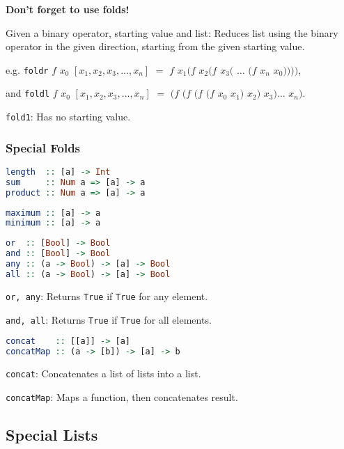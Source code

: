 \documentclass[twocolumn,english]{article}
\begin{document}
\textbf{Don't forget to use folds!}

Given a binary operator, starting value and list: Reduces list using
the binary operator in the given direction, starting from the given
starting value.

e.g. \texttt{foldr} $f$ $x_{0}$ $[x_{1},x_{2},x_{3},\dots,x_{n}]$
$=$ $f$ $x_{1}(f$ $x_{2}(f$ $x_{3}($ $\dots$ $(f$ $x_{n}$
$x_{0}))))$,

and \texttt{foldl} $f$ $x_{0}$ $[x_{1},x_{2},x_{3},\dots,x_{n}]$
$=$ $(f$ $(f$ $(f$ $(f$ $x_{0}$ $x_{1})$ $x_{2})$ $x_{3})$$\dots$
$x_{n})$.

\texttt{fold1}: Has no starting value.


\subsubsection{Special Folds}

\begin{lstlisting}[language=Haskell,frame=single]
length  :: [a] -> Int
sum     :: Num a => [a] -> a
product :: Num a => [a] -> a
\end{lstlisting}


\begin{lstlisting}[language=Haskell,frame=single]
maximum :: [a] -> a
minimum :: [a] -> a
\end{lstlisting}


\begin{lstlisting}[language=Haskell,frame=single]
or  :: [Bool] -> Bool
and :: [Bool] -> Bool
any :: (a -> Bool) -> [a] -> Bool
all :: (a -> Bool) -> [a] -> Bool
\end{lstlisting}


\texttt{or, any}: Returns \texttt{True} if \texttt{True} for any element.

\texttt{and, all}: Returns \texttt{True} if \texttt{True} for all
elements.

\begin{lstlisting}[language=Haskell,frame=single]
concat    :: [[a]] -> [a]
concatMap :: (a -> [b]) -> [a] -> b
\end{lstlisting}


\texttt{concat}: Concatenates a list of lists into a list.

\texttt{concatMap}: Maps a function, then concatenates result.


\subsection{Special Lists}
\end{document}
